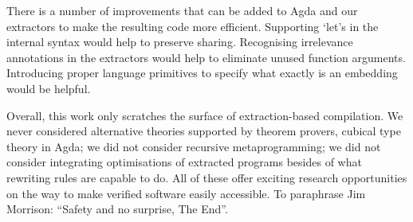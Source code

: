 There is a number of improvements that can be added to
Agda and our extractors to make the resulting code more
efficient.  Supporting `let's in the internal syntax
would help to preserve sharing.  Recognising irrelevance
annotations in the extractors would help to eliminate
unused function arguments.  Introducing proper language
primitives to specify what exactly is an embedding would
be helpful.

Overall, this work only scratches the surface of extraction-based
compilation.  We never considered alternative theories supported
by theorem provers, \eg{} cubical type theory in Agda; we did not
consider recursive metaprogramming; we did not consider integrating
optimisations of extracted programs besides of what rewriting rules
are capable to do.  All of these offer exciting research opportunities
on the way to make verified software easily accessible.
To paraphrase Jim Morrison: ``Safety and no surprise, The End''.
